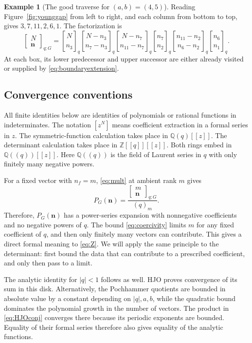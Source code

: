 \documentclass[12pt,reqno]{amsart}
\numberwithin{equation}{section}
\theoremstyle{definition}
\newtheorem*{example}{Example}
\theoremstyle{remark}
\theoremstyle{plain}
\newcommand{\ZZ}{\mathbb Z}
\newcommand{\QQ}{\mathbb Q}
\newcommand{\nn}{\mathbf n}
\newcommand{\qbin}[2]{\genfrac{[}{]}{0pt}{}{#1}{#2}_{q}}
\newcommand{\mult}[2]{\left[\begin{matrix}#1\\#2\end{matrix}\right]_{q;G}}
\begin{document}
\begin{example}[The good traverse for $(a,b)=(4,5)$]
Reading Figure~\ref{fig:younggap} from left to right, and each column
from bottom to top, gives $3,7,11,2,6,1$.
The factorization is
\[
 \mult N\nn=
 \qbin N{n_3}\qbin{N-n_3}{n_7-n_3}
 \qbin{N-n_7}{n_{11}-n_7}\qbin{n_7}{n_2}
 \qbin{n_{11}-n_2}{n_6-n_2}\qbin{n_6}{n_1}.
\]
At each box, its lower predecessor and upper successor are either
already visited or supplied by \eqref{eq:boundaryextension}.
\end{example}


\subsection{Convergence conventions}
All finite identities below are identities of polynomials or rational functions in indeterminates. The notation $[z^N]$ means coefficient extraction in a formal series in $z$. 
The symmetric-function calculation takes place in $\QQ(q)[[z]]$.  The determinant calculation takes place in $\ZZ[[q]][[z]]$.  Both rings embed in $\QQ((q))[[z]]$.
 Here $\QQ((q))$ is the field of Laurent series in $q$ with only finitely many negative powers. 


For a fixed vector with $n_f=m$, \eqref{eq:mult} at ambient rank $m$ gives
\[
 P_G(\nn)=\frac{\mult m\nn}{(q)_m}.
\]
Therefore, $P_G(\nn)$ has a power-series expansion with nonnegative coefficients and no negative powers of $q$. The bound \eqref{eq:coercivity} limits $m$ for any fixed coefficient of $q$, and then only finitely many vectors can contribute. This gives a direct formal meaning to \eqref{eq:Z}. We will apply the same principle to the determinant: first bound the data that can contribute to a prescribed coefficient, and only then pass to a limit.

The analytic identity for $|q|<1$ follows as well. HJO proves convergence of its sum in this disk. Alternatively, the Pochhammer quotients are bounded in absolute value by a constant depending on $|q|,a,b$, while the quadratic bound dominates the polynomial growth in the number of vectors. The product in \eqref{eq:HJOconj} converges there because its periodic exponents are bounded. Equality of their formal series therefore also gives equality of the analytic functions.
\end{document}
